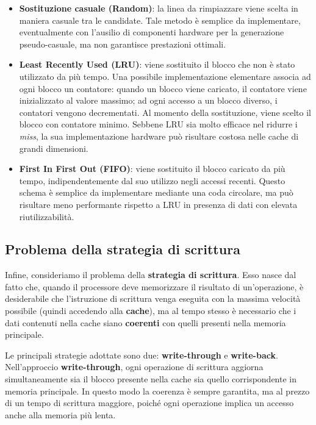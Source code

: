 \begin{itemize}
  \item \textbf{Sostituzione casuale (Random)}: la linea da rimpiazzare viene scelta in maniera casuale tra le candidate. Tale metodo è semplice da implementare, eventualmente con l'ausilio di componenti hardware per la generazione pseudo-casuale, ma non garantisce prestazioni ottimali.
  
  \item \textbf{Least Recently Used (LRU)}: viene sostituito il blocco che non è stato utilizzato da più tempo. Una possibile implementazione elementare associa ad ogni blocco un contatore: quando un blocco viene caricato, il contatore viene inizializzato al valore massimo; ad ogni accesso a un blocco diverso, i contatori vengono decrementati. Al momento della sostituzione, viene scelto il blocco con contatore minimo. Sebbene LRU sia molto efficace nel ridurre i \textit{miss}, la sua implementazione hardware può risultare costosa nelle cache di grandi dimensioni.
  
  \item \textbf{First In First Out (FIFO)}: viene sostituito il blocco caricato da più tempo, indipendentemente dal suo utilizzo negli accessi recenti. Questo schema è semplice da implementare mediante una coda circolare, ma può risultare meno performante rispetto a LRU in presenza di dati con elevata riutilizzabilità.
\end{itemize}

\subsection{Problema della strategia di scrittura}
Infine, consideriamo il problema della \textbf{strategia di scrittura}. Esso nasce dal fatto che, quando il processore deve memorizzare il risultato di un'operazione, è desiderabile che l'istruzione di scrittura venga eseguita con la massima velocità possibile (quindi accedendo alla \textbf{cache}), ma al tempo stesso è necessario che i dati contenuti nella cache siano \textbf{coerenti} con quelli presenti nella memoria principale.  

\noindent
Le principali strategie adottate sono due: \textbf{write-through} e \textbf{write-back}.  
Nell'approccio \textbf{write-through}, ogni operazione di scrittura aggiorna simultaneamente sia il blocco presente nella cache sia quello corrispondente in memoria principale. In questo modo la coerenza è sempre garantita, ma al prezzo di un tempo di scrittura maggiore, poiché ogni operazione implica un accesso anche alla memoria più lenta.  

